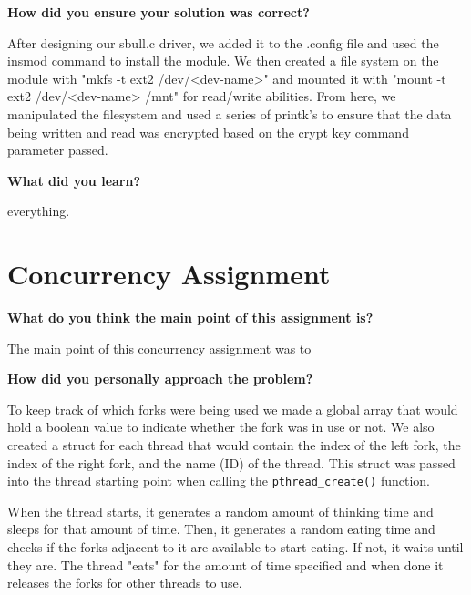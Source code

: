 \documentclass[10pt,letterpaper,draftclsnofoot,onecolumn]{IEEEtran}
\begin{document}
\medskip


\bigskip

\noindent\textbf{How did you ensure your solution was correct?}
\medskip

\medskip

\noindent After designing our sbull.c driver, we added it to the .config file and used the insmod command to install the module. We then created a file system on the module with "mkfs -t ext2 /dev/<dev-name>" and mounted it with "mount -t ext2 /dev/<dev-name> /mnt" for read/write abilities. From here, we manipulated the filesystem and used a series of printk's to ensure that the data being written and read was encrypted based on the crypt key command parameter passed.

\bigskip

\noindent\textbf{What did you learn?}
\medskip

\medskip

\noindent everything.

\section{Concurrency Assignment}
\bigskip

\noindent\textbf{What do you think the main point of this assignment is?}
\medskip

\medskip

\noindent The main point of this concurrency assignment was to 

\bigskip

\noindent\textbf{How did you personally approach the problem?}
\medskip

\medskip

\noindent To keep track of which forks were being used we made a global array that would hold a boolean value to indicate whether the fork was in use or not. We also created a struct for each thread that would contain the index of the left fork, the index of the right fork, and the name (ID) of the thread. This struct was passed into the thread starting point when calling the \texttt{pthread\_create()} function.\par
\medskip

\medskip

\noindent When the thread starts, it generates a random amount of thinking time and sleeps for that amount of time. Then, it generates a random eating time and checks if the forks adjacent to it are available to start eating. If not, it waits until they are. The thread "eats" for the amount of time specified and when done it releases the forks for other threads to use.\par
\medskip
\end{document}
